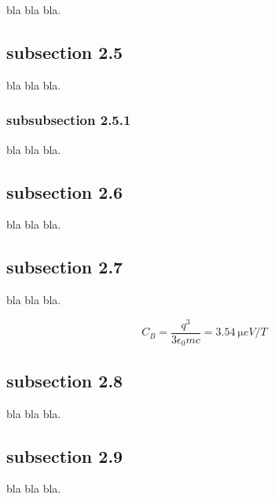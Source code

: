 \documentclass[letter,
               biblatex,     %
               keeplastbox,   %
               ]{jacow}
\begin{document}
bla bla bla.

\subsection{subsection 2.5}

bla bla bla.

\subsubsection{subsubsection 2.5.1} bla bla bla.

\subsection{subsection 2.6}

bla bla bla.

\subsection{subsection 2.7}

bla bla bla.

\begin{equation}\label{eq:label}
    C_B=\frac{q^3}{3\epsilon_{0} mc}=\SI{3.54}{\micro eV/T}
\end{equation}

\subsection{subsection 2.8}
	
bla bla bla.

\subsection{subsection 2.9}
bla bla bla.
\end{document}
